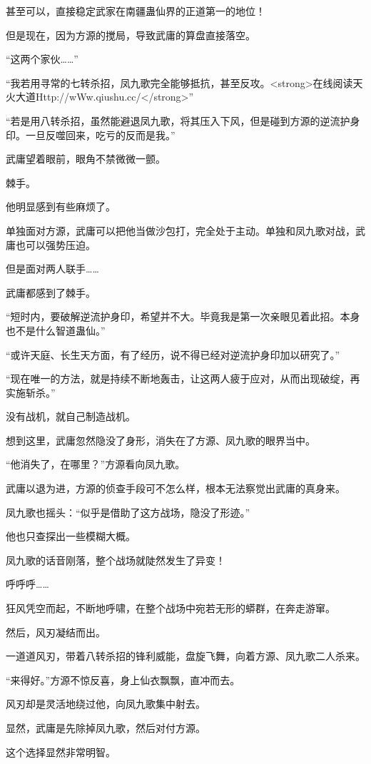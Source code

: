 \begin{this_body}
甚至可以，直接稳定武家在南疆蛊仙界的正道第一的地位！

但是现在，因为方源的搅局，导致武庸的算盘直接落空。

“这两个家伙……”

“我若用寻常的七转杀招，凤九歌完全能够抵抗，甚至反攻。<strong>在线阅读天火大道Http://wWw.qiushu.cc/</strong>”

“若是用八转杀招，虽然能避退凤九歌，将其压入下风，但是碰到方源的逆流护身印。一旦反噬回来，吃亏的反而是我。”

武庸望着眼前，眼角不禁微微一颤。

棘手。

他明显感到有些麻烦了。

单独面对方源，武庸可以把他当做沙包打，完全处于主动。单独和凤九歌对战，武庸也可以强势压迫。

但是面对两人联手……

武庸都感到了棘手。

“短时内，要破解逆流护身印，希望并不大。毕竟我是第一次亲眼见着此招。本身也不是什么智道蛊仙。”

“或许天庭、长生天方面，有了经历，说不得已经对逆流护身印加以研究了。”

“现在唯一的方法，就是持续不断地轰击，让这两人疲于应对，从而出现破绽，再实施斩杀。”

没有战机，就自己制造战机。

想到这里，武庸忽然隐没了身形，消失在了方源、凤九歌的眼界当中。

“他消失了，在哪里？”方源看向凤九歌。

武庸以退为进，方源的侦查手段可不怎么样，根本无法察觉出武庸的真身来。

凤九歌也摇头：“似乎是借助了这方战场，隐没了形迹。”

他也只查探出一些模糊大概。

凤九歌的话音刚落，整个战场就陡然发生了异变！

呼呼呼……

狂风凭空而起，不断地呼啸，在整个战场中宛若无形的蟒群，在奔走游窜。

然后，风刃凝结而出。

一道道风刃，带着八转杀招的锋利威能，盘旋飞舞，向着方源、凤九歌二人杀来。

“来得好。”方源不惊反喜，身上仙衣飘飘，直冲而去。

风刃却是灵活地绕过他，向凤九歌集中射去。

显然，武庸是先除掉凤九歌，然后对付方源。

这个选择显然非常明智。


\end{this_body}
